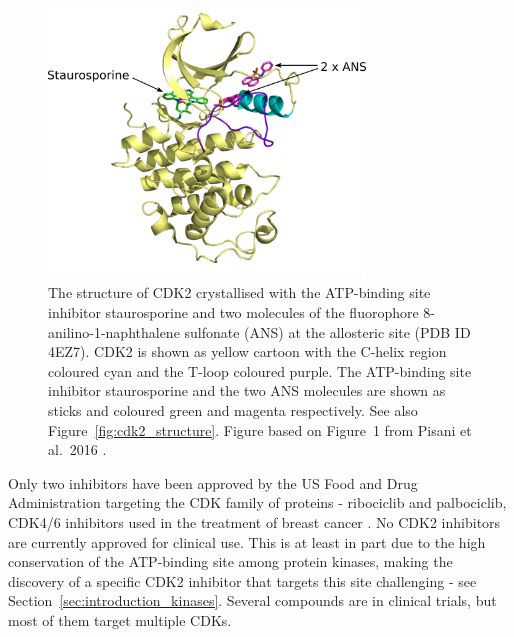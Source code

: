 \begin{figure}
\centering

\includegraphics[width=0.75\textwidth]{figures/cdk2_intro/cdk2_intro}

\caption[Structure of CDK2]
{The structure of CDK2 crystallised with the ATP-binding site inhibitor staurosporine and two molecules of the fluorophore 8-anilino-1-naphthalene sulfonate (ANS) at the allosteric site (PDB ID 4EZ7).
CDK2 is shown as yellow cartoon with the \textalpha C-helix region coloured cyan and the T-loop coloured purple.
The ATP-binding site inhibitor staurosporine and the two ANS molecules are shown as sticks and coloured green and magenta respectively.
See also Figure~\ref{fig:cdk2_structure}.
Figure based on Figure~1 from Pisani et al.\ 2016 \cite{Pisani2016}.}

\label{fig:cdk2_intro}
\end{figure}


Only two inhibitors have been approved by the US Food and Drug Administration targeting the CDK family of proteins - ribociclib and palbociclib, CDK4/6 inhibitors used in the treatment of breast cancer \cite{Hortobagyi2016}.
No CDK2 inhibitors are currently approved for clinical use.
This is at least in part due to the high conservation of the ATP-binding site among protein kinases, making the discovery of a specific CDK2 inhibitor that targets this site challenging - see Section~\ref{sec:introduction_kinases}.
Several compounds are in clinical trials, but most of them target multiple CDKs.

